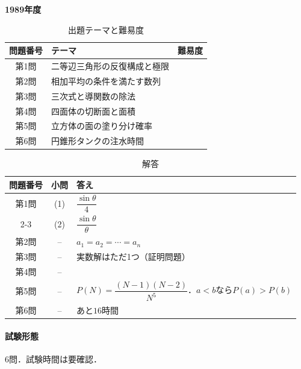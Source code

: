 \documentclass[../../main.tex]{subfiles}
\begin{document}
\begin{center}
  {\fontsize{48pt}{58pt}\selectfont \textbf{1989}\normalsize\textbf{年度}}
\end{center}

\begin{table}[htb]
  \centering
  \caption{出題テーマと難易度}
  \begin{tabular}{|c|p{9cm}|c|}
    \hline
    \textbf{問題番号} & \textbf{テーマ} & \textbf{難易度} \\
    \hline
    第1問 & 二等辺三角形の反復構成と極限 & \\
    \hline
    第2問 & 相加平均の条件を満たす数列 & \\
    \hline
    第3問 & 三次式と導関数の除法 & \\
    \hline
    第4問 & 四面体の切断面と面積 & \\
    \hline
    第5問 & 立方体の面の塗り分け確率 & \\
    \hline
    第6問 & 円錐形タンクの注水時間 & \\
    \hline
  \end{tabular}
\end{table}

\begin{table}[htb]
  \centering
  \caption{解答}
  \renewcommand{\arraystretch}{1.4}
  \begin{tabular}{|c|c|p{9cm}|}
    \hline
    \textbf{問題番号} & \textbf{小問} & \textbf{答え} \\
    \hline
    第1問 & (1) & $\dfrac{\sin\theta}{4}$ \\
    \cline{2-3}
    & (2) & $\dfrac{\sin\theta}{\theta}$ \\
    \hline
    第2問 & -- & $a_1=a_2=\cdots=a_n$ \\
    \hline
    第3問 & -- & 実数解はただ1つ（証明問題） \\
    \hline
    第4問 & -- &  \\
    \hline
    第5問 & -- & $P(N)=\dfrac{(N-1)(N-2)}{N^5}$．$a<b$なら$P(a)>P(b)$ \\
    \hline
    第6問 & -- & あと$16$時間 \\
    \hline
  \end{tabular}
\end{table}

\paragraph{試験形態}
6問．試験時間は要確認．
\end{document}
